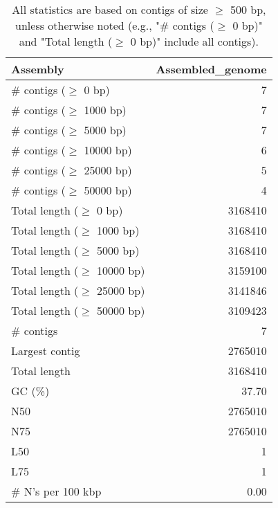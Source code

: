 \documentclass[12pt,a4paper]{article}
\begin{document}
\begin{table}[ht]
\begin{center}
\caption{All statistics are based on contigs of size $\geq$ 500 bp, unless otherwise noted (e.g., "\# contigs ($\geq$ 0 bp)" and "Total length ($\geq$ 0 bp)" include all contigs).}
\begin{tabular}{|l*{1}{|r}|}
\hline
Assembly & Assembled\_genome \\ \hline
\# contigs ($\geq$ 0 bp) & 7 \\ \hline
\# contigs ($\geq$ 1000 bp) & 7 \\ \hline
\# contigs ($\geq$ 5000 bp) & 7 \\ \hline
\# contigs ($\geq$ 10000 bp) & 6 \\ \hline
\# contigs ($\geq$ 25000 bp) & 5 \\ \hline
\# contigs ($\geq$ 50000 bp) & 4 \\ \hline
Total length ($\geq$ 0 bp) & 3168410 \\ \hline
Total length ($\geq$ 1000 bp) & 3168410 \\ \hline
Total length ($\geq$ 5000 bp) & 3168410 \\ \hline
Total length ($\geq$ 10000 bp) & 3159100 \\ \hline
Total length ($\geq$ 25000 bp) & 3141846 \\ \hline
Total length ($\geq$ 50000 bp) & 3109423 \\ \hline
\# contigs & 7 \\ \hline
Largest contig & 2765010 \\ \hline
Total length & 3168410 \\ \hline
GC (\%) & 37.70 \\ \hline
N50 & 2765010 \\ \hline
N75 & 2765010 \\ \hline
L50 & 1 \\ \hline
L75 & 1 \\ \hline
\# N's per 100 kbp & 0.00 \\ \hline
\end{tabular}
\end{center}
\end{table}
\end{document}
